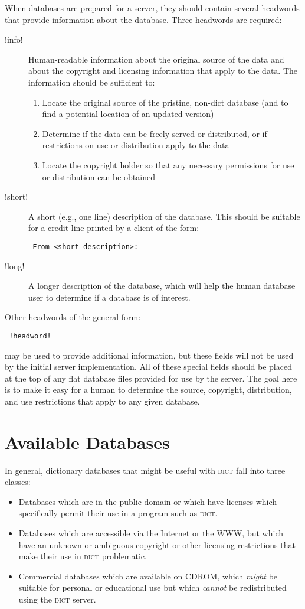 \documentclass{article}
\newcommand{\dict}{\textsc{dict}\xspace}
\begin{document}
When databases are prepared for a server, they should contain several
headwords that provide information about the database.  Three headwords are
required:
\begin{description}
\item[!info!] Human-readable information about the original source of the
  data and about the copyright and licensing information that apply to the
  data.  The information should be sufficient to:
  \begin{enumerate}
  \item Locate the original source of the pristine, non-dict database (and
    to find a potential location of an updated version)
  \item Determine if the data can be freely served or distributed, or if
    restrictions on use or distribution apply to the data
  \item Locate the copyright holder so that any necessary permissions for
    use or distribution can be obtained
  \end{enumerate}
\item[!short!] A short (e.g., one line) description of the database.  This
  should be suitable for a credit line printed by a client of the form:
  \begin{center}\tt
    From <short-description>:
  \end{center}
\item[!long!] A longer description of the database, which will help the
  human database user to determine if a database is of interest.
\end{description}

Other headwords of the general form:
\begin{center}\tt
  !headword!
\end{center}
may be used to provide additional information, but these fields will not be
used by the initial server implementation.  All of these special fields
should be placed at the top of  any flat database files provided for use by
the server.  The goal here is to make it easy for a human to determine the
source, copyright, distribution, and use restrictions that apply to any
given database.

\section{Available Databases}

In general, dictionary databases that might be useful with \dict fall into
three classes:
\begin{itemize}
\item Databases which are in the public domain or which have licenses which
  specifically permit their use in a program such as \dict.
\item Databases which are accessible via the Internet or the WWW, but which
  have an unknown or ambiguous copyright or other licensing restrictions
  that make their use in \dict problematic.
\item Commercial databases which are available on CDROM, which \emph{might}
  be suitable for personal or educational use but which \emph{cannot} be
  redistributed using the \dict server.
\end{itemize}
\end{document}

